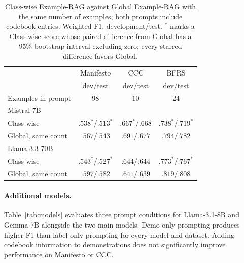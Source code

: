 \documentclass[11pt]{article}
\begin{document}
\begin{table}[!t]
\centering
\begin{tabular}{lccc}
\toprule
 & Manifesto & CCC & BFRS \\
 & dev/test & dev/test & dev/test \\
\midrule
Examples in prompt & $98$ & $10$ & $24$ \\
\midrule
\multicolumn{4}{l}{Mistral-7B} \\
Class-wise & $.538^*$/$.513^*$ & $.667^*$/$.668$ & $.738^*$/$.719^*$ \\
Global, same count & $.567$/$.543$ & $.691$/$.677$ & $.794$/$.782$ \\
\midrule
\multicolumn{4}{l}{Llama-3.3-70B} \\
Class-wise & $.543^*$/$.527^*$ & $.644$/$.644$ & $.773^*$/$.767^*$ \\
Global, same count & $.597$/$.582$ & $.641$/$.639$ & $.819$/$.808$ \\
\bottomrule
\end{tabular}
\caption{Class-wise Example-RAG against Global Example-RAG with the same number of examples; both prompts include codebook entries. Weighted F1, development/test. $^*$ marks a Class-wise score whose paired difference from Global has a 95\% bootstrap interval excluding zero; every starred difference favors Global.}
\label{tab:perclass}
\end{table}



\paragraph{Additional models.}
Table~\ref{tab:models} evaluates three prompt conditions for Llama-3.1-8B and Gemma-7B alongside the two main models. Demo-only prompting produces higher F1 than label-only prompting for every model and dataset. Adding codebook information to demonstrations does not significantly improve performance on Manifesto or CCC.
\end{document}
